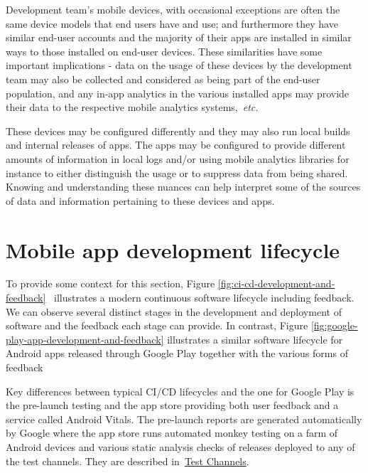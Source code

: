 Development team's mobile devices, with occasional exceptions are often the same device models that end users have and use; and furthermore they have similar end-user accounts and the majority of their apps are installed in similar ways to those installed on end-user devices. These similarities have some important implications - data on the usage of these devices by the development team may also be collected and considered as being part of the end-user population, and any in-app analytics in the various installed apps may provide their data to the respective mobile analytics systems,~\emph{etc.}

These devices may be configured differently and they may also run local builds and internal releases of apps. The apps may be configured to provide different amounts of information in local logs and/or using mobile analytics libraries for instance to either distinguish the usage or to suppress data from being shared. Knowing and understanding these nuances can help interpret some of the sources of data and information pertaining to these devices and apps.


\section{Mobile app development lifecycle}
To provide some context for this section, Figure \ref{fig:ci-cd-development-and-feedback}~
illustrates a modern continuous software lifecycle including feedback. We can observe several distinct stages in the development and deployment of software and the feedback each stage can provide. %
%
In contrast, Figure \ref{fig:google-play-app-development-and-feedback} illustrates a similar software lifecycle for Android apps released through Google Play together with the various forms of feedback~ 

Key differences between typical CI/CD lifecycles and the one for Google Play is the pre-launch testing and the app store providing both user feedback and a service called Android Vitals. The pre-launch reports are generated automatically by Google where the app store runs automated monkey testing on a farm of Android devices and various static analysis checks of releases deployed to any of the test channels. They are described in~\href{subsection-test-channels}{Test Channels}. %


